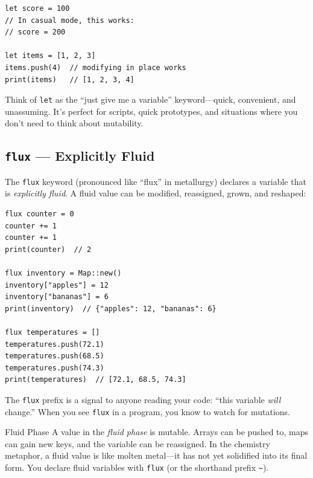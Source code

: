 \begin{lstlisting}[language=Lattice, caption={let bindings are fluid in casual mode}]
let score = 100
// In casual mode, this works:
// score = 200

let items = [1, 2, 3]
items.push(4)  // modifying in place works
print(items)   // [1, 2, 3, 4]
\end{lstlisting}

Think of \lstinline|let| as the ``just give me a variable'' keyword---quick, convenient, and unassuming.
It's perfect for scripts, quick prototypes, and situations where you don't need to think about mutability.

\subsection{\texttt{flux} --- Explicitly Fluid}\label{subsec:flux}

The \lstinline|flux| keyword (pronounced like ``flux'' in metallurgy) declares a variable that is \emph{explicitly fluid}.
A fluid value can be modified, reassigned, grown, and reshaped:

\begin{lstlisting}[language=Lattice, caption={Declaring mutable variables with flux}]
flux counter = 0
counter += 1
counter += 1
print(counter)  // 2

flux inventory = Map::new()
inventory["apples"] = 12
inventory["bananas"] = 6
print(inventory)  // {"apples": 12, "bananas": 6}

flux temperatures = []
temperatures.push(72.1)
temperatures.push(68.5)
temperatures.push(74.3)
print(temperatures)  // [72.1, 68.5, 74.3]
\end{lstlisting}

The \lstinline|flux| prefix is a signal to anyone reading your code: ``this variable \emph{will} change.''
When you see \lstinline|flux| in a program, you know to watch for mutations.

\begin{defnbox}{Fluid Phase}
A value in the \emph{fluid phase} is mutable.
Arrays can be pushed to, maps can gain new keys, and the variable can be reassigned.
In the chemistry metaphor, a fluid value is like molten metal---it has not yet solidified into its final form.
You declare fluid variables with \lstinline|flux| (or the shorthand prefix \lstinline|~|).
\end{defnbox}

